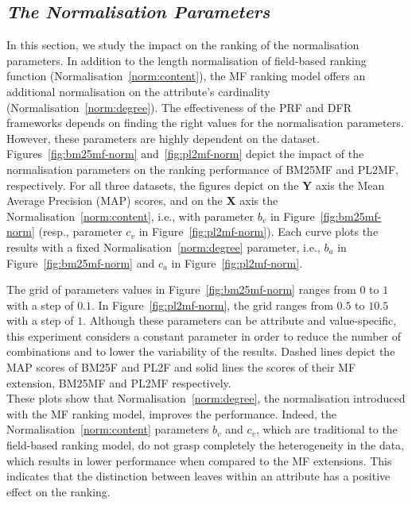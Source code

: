 %

\subsection{\emph{The Normalisation Parameters}}
\label{sec:norm-exp}

In this section, we study the impact on the ranking of the normalisation parameters. In addition to the length normalisation of field-based ranking function (Normalisation~\ref{norm:content}), the MF ranking model offers an additional normalisation on the attribute's cardinality (Normalisation~\ref{norm:degree}). The effectiveness of the PRF and DFR frameworks depends on finding the right values for the normalisation parameters. However, these parameters are highly dependent on the dataset.\\

Figures~\ref{fig:bm25mf-norm} and~\ref{fig:pl2mf-norm} depict the impact of the normalisation parameters on the ranking performance of BM25MF and PL2MF, respectively. For all three datasets, the figures depict on the \textbf{Y} axis the Mean Average Precision (MAP) scores, and on the \textbf{X} axis the Normalisation~\ref{norm:content}, i.e., with parameter $b_v$ in Figure~\ref{fig:bm25mf-norm} (resp., parameter $c_v$ in Figure~\ref{fig:pl2mf-norm}). Each curve plots the results with a fixed Normalisation~\ref{norm:degree} parameter, i.e., $b_a$ in Figure~\ref{fig:bm25mf-norm} and $c_a$ in Figure~\ref{fig:pl2mf-norm}.

The grid of parameters values in Figure~\ref{fig:bm25mf-norm} ranges from $0$ to $1$ with a step of $0.1$. In Figure~\ref{fig:pl2mf-norm}, the grid ranges from $0.5$ to $10.5$ with a step of $1$. Although these parameters can be attribute and value-specific, this experiment considers a constant parameter in order to reduce the number of combinations and to lower the variability of the results. Dashed lines depict the MAP scores of BM25F and PL2F and solid lines the scores of their MF extension, BM25MF and PL2MF respectively.\\

These plots show that Normalisation~\ref{norm:degree}, the normalisation introduced with the MF ranking model, improves the performance. Indeed, the Normalisation~\ref{norm:content} parameters $b_v$ and $c_v$, which are traditional to the field-based ranking model, do not grasp completely the heterogeneity in the data, which results in lower performance when compared to the MF extensions. This indicates that the distinction between leaves within an attribute has a positive effect on the ranking.

